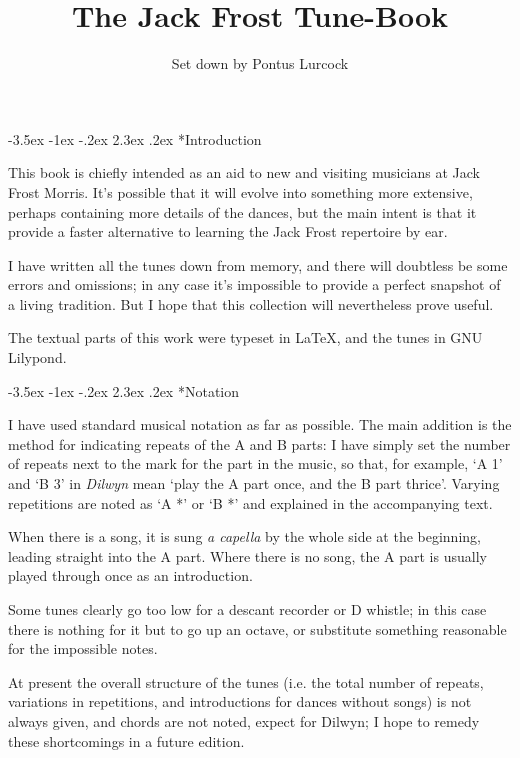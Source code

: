 \documentclass[12pt,a4paper]{article}
\title{The Jack Frost Tune-Book}
\author{\small Set down by Pontus Lurcock}
\makeatletter
\renewcommand\section{\@startsection {section}{1}{\z@}%
                                   {-3.5ex \@plus -1ex \@minus -.2ex}%
                                   {2.3ex \@plus.2ex}%
                                   {\normalfont\Large}}
\renewcommand\subsection{\@startsection {subsection}{1}{\z@}%
                                   {-3.5ex \@plus -1ex \@minus -.2ex}%
                                   {2.3ex \@plus.2ex}%
                                   {\normalfont\large\itshape}}
\makeatother
\begin{document}
\maketitle
\samepage

\section*{Introduction}

This book is chiefly intended as an aid to new and visiting musicians
at Jack Frost Morris. It's possible that it will evolve into something
more extensive, perhaps containing more details of the dances, but the
main intent is that it provide a faster alternative to learning the
Jack Frost repertoire by ear.

I have written all the tunes down from memory, and there will
doubtless be some errors and omissions; in any case it's impossible to
provide a perfect snapshot of a living tradition. But I hope that this
collection will nevertheless prove useful.

The textual parts of this work were typeset in \LaTeX{}, and the tunes
in GNU Lilypond.

\subsection*{Notation}

I have used standard musical notation as far as possible. The main
addition is the method for indicating repeats of the A and B parts: I
have simply set the number of repeats next to the mark for the part in
the music, so that, for example, `A 1' and `B 3' in {\it Dilwyn} mean
`play the A part once, and the B part thrice'. Varying repetitions are
noted as `A *' or `B *' and explained in the accompanying text.

When there is a song, it is sung {\it a capella} by the whole side at
the beginning, leading straight into the A part. Where there is no
song, the A part is usually played through once as an introduction.

Some tunes clearly go too low for a descant recorder or D whistle; in
this case there is nothing for it but to go up an octave, or
substitute something reasonable for the impossible notes.

At present the overall structure of the tunes (i.e. the total number
of repeats, variations in repetitions, and introductions for dances
without songs) is not always given, and chords are not noted, expect
for Dilwyn; I hope to remedy these shortcomings in a future edition.
\end{document}
